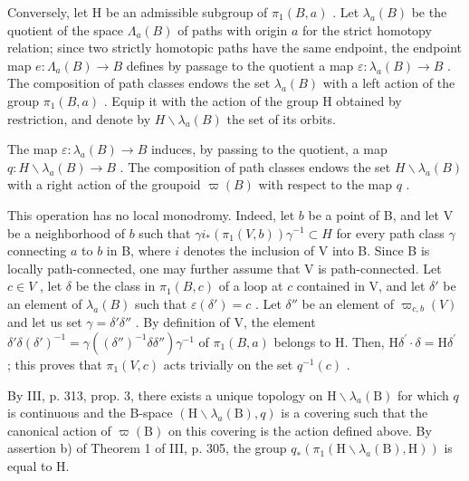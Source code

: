 Conversely, let H be an admissible subgroup of \(\pi_1(B, a)\) . Let \(\lambda_a(B)\) be the quotient of the space \(\Lambda_a(B)\) of paths with origin \(a\) for the strict homotopy relation; since two strictly homotopic paths have the same endpoint, the endpoint map \(e: \Lambda_a(B) \to B\) defines by passage to the quotient a map \(\varepsilon: \lambda_a(B) \to B\) . The composition of path classes endows the set \(\lambda_a(B)\) with a left action of the group \(\pi_1(B, a)\) . Equip it with the action of the group H obtained by restriction, and denote by \(H\backslash\lambda_a(B)\) the set of its orbits.

The map \(\varepsilon\colon\lambda_{a}(B)\to B\) induces, by passing to the quotient, a map \(q\colon H\backslash\lambda_{a}(B)\to B\) . The composition of path classes endows the set \(H\backslash\lambda_a(B)\) with a right action of the groupoid \(\varpi(B)\) with respect to the map \(q\) .

This operation has no local monodromy. Indeed, let \(b\) be a point of B, and let V be a neighborhood of \(b\) such that \(\gamma i_{*}(\pi_{1}(V,b))\gamma^{-1}\subset H\) for every path class \(\gamma\) connecting \(a\) to \(b\) in B, where \(i\) denotes the inclusion of V into B. Since B is locally path-connected, one may further assume that V is path-connected. Let \(c\in V\) , let \(\delta\) be the class in \(\pi_1(B,c)\) of a loop at \(c\) contained in V, and let \(\delta'\) be an element of \(\lambda_a(B)\) such that \(\varepsilon (\delta ') = c\) . Let \(\delta''\) be an element of \(\varpi_{c,b}(V)\) and let us set \(\gamma = \delta '\delta ''\) . By definition of V, the element \(\delta '\delta (\delta ')^{-1} = \gamma ((\delta '')^{-1}\delta \delta '')\gamma^{-1}\) of \(\pi_1(B,a)\) belongs to H. Then, \(\mathrm{H}\delta^{\prime}\cdot \delta = \mathrm{H}\delta^{\prime}\) ; this proves that \(\pi_1(V,c)\) acts trivially on the set \(q^{-1}(c)\) .

By III, p. 313, prop. 3, there exists a unique topology on \(\mathrm{H}\backslash\lambda_{a}(\mathrm{B})\) for which \(q\) is continuous and the B-space \((\mathrm{H}\backslash\lambda_{a}(\mathrm{B}),q)\) is a covering such that the canonical action of \(\varpi(\mathrm{B})\) on this covering is the action defined above. By assertion b) of Theorem 1 of III, p. 305, the group \(q_{*}(\pi_{1}(\mathrm{H}\backslash\lambda_{a}(\mathrm{B}),\mathrm{H}))\) is equal to H.

